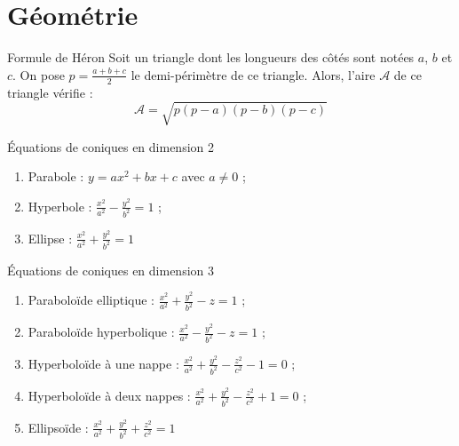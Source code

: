 \documentclass[french]{article}
\theoremstyle{theorem}
\theoremstyle{definition}
\begin{document}
\section{Géométrie}

\begin{lem}{Formule de Héron}
	Soit un triangle dont les longueurs des côtés sont notées $a$, $b$ et $c$. On pose $p=\displaystyle\frac{a+b+c}{2}$ le demi-périmètre de ce triangle. Alors, l'aire $\mathcal{A}$ de ce triangle vérifie : $$\mathcal{A}=\sqrt{p(p-a)(p-b)(p-c)}$$
\end{lem}

\begin{lem}{Équations de coniques en dimension 2}
	\begin{enumerate}
		\item Parabole : $y=ax^2+bx+c$ avec $a\ne 0$ ;
		\item Hyperbole : $\displaystyle\frac{x^2}{a^2}-\frac{y^2}{b^2}=1$ ;
		\item Ellipse : $\displaystyle\frac{x^2}{a^2}+\frac{y^2}{b^2}=1$
	\end{enumerate}
\end{lem}

\begin{lem}{Équations de coniques en dimension 3}
	\begin{enumerate}
		\item Paraboloïde elliptique : $\displaystyle\frac{x^2}{a^2}+\frac{y^2}{b^2}-z=1$ ;
		\item Paraboloïde hyperbolique : $\displaystyle\frac{x^2}{a^2}-\frac{y^2}{b^2}-z=1$ ;
		\item Hyperboloïde à une nappe : $\displaystyle\frac{x^2}{a^2}+\frac{y^2}{b^2}-\frac{z^2}{c^2}-1=0$ ;
		\item Hyperboloïde à deux nappes : $\displaystyle\frac{x^2}{a^2}+\frac{y^2}{b^2}-\frac{z^2}{c^2}+1=0$ ;
		\item Ellipsoïde : $\displaystyle\frac{x^2}{a^2}+\frac{y^2}{b^2}+\frac{z^2}{c^2}=1$
	\end{enumerate}
\end{lem}
\end{document}
